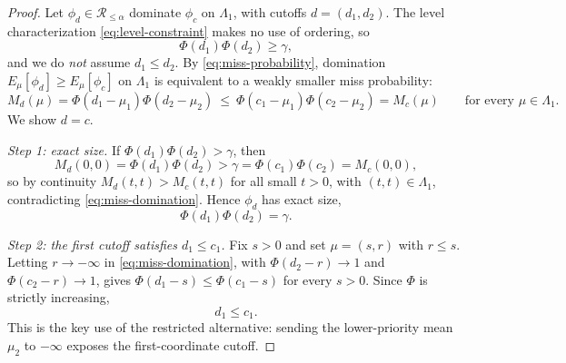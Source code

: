 \documentclass[12pt]{article}
\theoremstyle{definition}
\theoremstyle{remark}
\begin{document}
\begin{proof}
Let $\phi_d\in\mathcal R_{\le\alpha}$ dominate $\phi_c$ on $\Lambda_1$, with cutoffs $d=(d_1,d_2)$. The level characterization \eqref{eq:level-constraint} makes no use of ordering, so
\begin{equation}\label{eq:d-level}
\Phi(d_1)\Phi(d_2)\ge\gamma,
\end{equation}
and we do \emph{not} assume $d_1\le d_2$. By \eqref{eq:miss-probability}, domination $E_\mu[\phi_d]\ge E_\mu[\phi_c]$ on $\Lambda_1$ is equivalent to a weakly smaller miss probability:
\begin{equation}\label{eq:miss-domination}
M_d(\mu)=\Phi(d_1-\mu_1)\Phi(d_2-\mu_2)\ \le\ \Phi(c_1-\mu_1)\Phi(c_2-\mu_2)=M_c(\mu)
\qquad\text{for every }\mu\in\Lambda_1.
\end{equation}
We show $d=c$.
 
\emph{Step 1: exact size.}
If $\Phi(d_1)\Phi(d_2)>\gamma$, then
\[
M_d(0,0)=\Phi(d_1)\Phi(d_2)>\gamma=\Phi(c_1)\Phi(c_2)=M_c(0,0),
\]
so by continuity $M_d(t,t)>M_c(t,t)$ for all small $t>0$, with $(t,t)\in\Lambda_1$, contradicting \eqref{eq:miss-domination}. Hence $\phi_d$ has exact size,
\begin{equation}\label{eq:d-exact}
\Phi(d_1)\Phi(d_2)=\gamma.
\end{equation}
 
\emph{Step 2: the first cutoff satisfies $d_1\le c_1$.}
Fix $s>0$ and set $\mu=(s,r)$ with $r\le s$. Letting $r\to-\infty$ in \eqref{eq:miss-domination}, with $\Phi(d_2-r)\to1$ and $\Phi(c_2-r)\to1$, gives $\Phi(d_1-s)\le\Phi(c_1-s)$ for every $s>0$. Since $\Phi$ is strictly increasing,
\begin{equation}\label{eq:first-cutoff-order}
d_1\le c_1.
\end{equation}
This is the key use of the restricted alternative: sending the lower-priority mean $\mu_2$ to $-\infty$ exposes the first-coordinate cutoff.
 

\end{proof}
\end{document}
